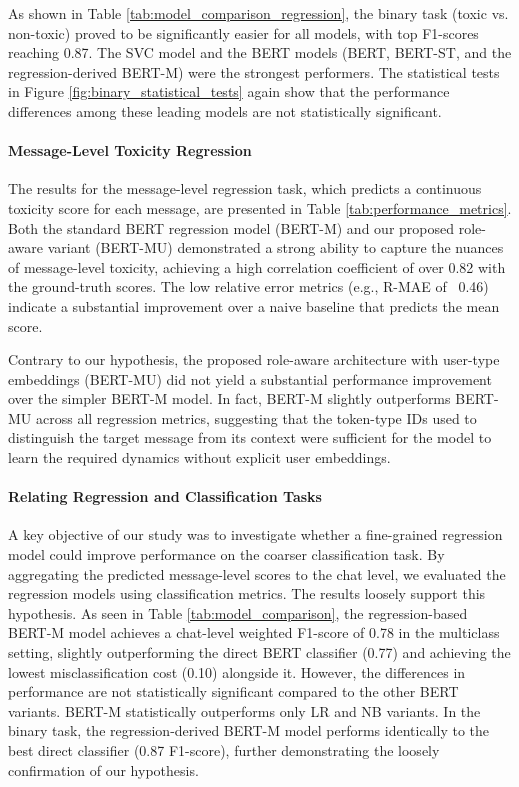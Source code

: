 \documentclass[twocolumn]{ceurart}
\begin{document}
As shown in Table \ref{tab:model_comparison_regression}, the binary task (toxic vs. non-toxic) proved to be significantly easier for all models, with top F1-scores reaching 0.87. The SVC model and the BERT models (BERT, BERT-ST, and the regression-derived BERT-M) were the strongest performers. The statistical tests in Figure \ref{fig:binary_statistical_tests} again show that the performance differences among these leading models are not statistically significant.

\paragraph{Message-Level Toxicity Regression}

The results for the message-level regression task, which predicts a continuous toxicity score for each message, are presented in Table \ref{tab:performance_metrics}. Both the standard BERT regression model (BERT-M) and our proposed role-aware variant (BERT-MU) demonstrated a strong ability to capture the nuances of message-level toxicity, achieving a high correlation coefficient of over 0.82 with the ground-truth scores. The low relative error metrics (e.g., R-MAE of ~0.46) indicate a substantial improvement over a naive baseline that predicts the mean score.

Contrary to our hypothesis, the proposed role-aware architecture with user-type embeddings (BERT-MU) did not yield a substantial performance improvement over the simpler BERT-M model. In fact, BERT-M slightly outperforms BERT-MU across all regression metrics, suggesting that the token-type IDs used to distinguish the target message from its context were sufficient for the model to learn the required dynamics without explicit user embeddings.

\paragraph{Relating Regression and Classification Tasks}

A key objective of our study was to investigate whether a fine-grained regression model could improve performance on the coarser classification task. By aggregating the predicted message-level scores to the chat level, we evaluated the regression models using classification metrics. The results loosely support this hypothesis. As seen in Table \ref{tab:model_comparison}, the regression-based BERT-M model achieves a chat-level weighted F1-score of 0.78 in the multiclass setting, slightly outperforming the direct BERT classifier (0.77) and achieving the lowest misclassification cost (0.10) alongside it. However, the differences in performance are not statistically significant compared to the other BERT variants. BERT-M statistically outperforms only LR and NB variants. In the binary task, the regression-derived BERT-M model performs identically to the best direct classifier (0.87 F1-score), further demonstrating the loosely confirmation of our hypothesis.
\end{document}
